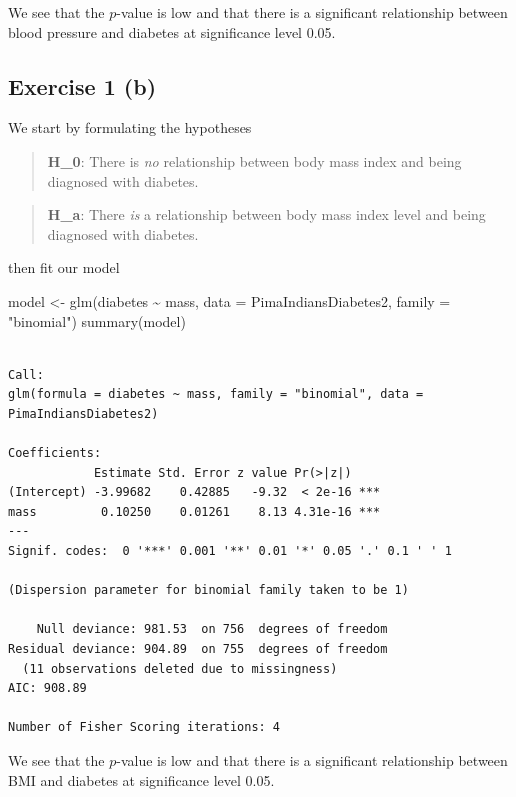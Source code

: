 \documentclass[
  letterpaper,
  DIV=11,
  numbers=noendperiod]{scrreprt}
\newenvironment{Shaded}{\begin{snugshade}}{\end{snugshade}}
\newcommand{\AttributeTok}[1]{\textcolor[rgb]{0.40,0.45,0.13}{#1}}
\newcommand{\FunctionTok}[1]{\textcolor[rgb]{0.28,0.35,0.67}{#1}}
\newcommand{\NormalTok}[1]{\textcolor[rgb]{0.00,0.23,0.31}{#1}}
\newcommand{\OtherTok}[1]{\textcolor[rgb]{0.00,0.23,0.31}{#1}}
\newcommand{\SpecialCharTok}[1]{\textcolor[rgb]{0.37,0.37,0.37}{#1}}
\newcommand{\StringTok}[1]{\textcolor[rgb]{0.13,0.47,0.30}{#1}}
\begin{document}
We see that the \(p\)-value is low and that there is a significant
relationship between blood pressure and diabetes at significance level
0.05.

\subsection{Exercise 1 (b)}\label{exercise-1-b}

We start by formulating the hypotheses

\begin{quote}
\textbf{H\_0}: There is \emph{no} relationship between body mass index
and being diagnosed with diabetes.
\end{quote}

\begin{quote}
\textbf{H\_a}: There \emph{is} a relationship between body mass index
level and being diagnosed with diabetes.
\end{quote}

then fit our model

\begin{Shaded}
\begin{Highlighting}[]
\NormalTok{model }\OtherTok{\textless{}{-}} \FunctionTok{glm}\NormalTok{(diabetes }\SpecialCharTok{\textasciitilde{}}\NormalTok{ mass, }\AttributeTok{data =}\NormalTok{ PimaIndiansDiabetes2, }\AttributeTok{family =} \StringTok{"binomial"}\NormalTok{)}
\FunctionTok{summary}\NormalTok{(model)}
\end{Highlighting}
\end{Shaded}

\begin{verbatim}

Call:
glm(formula = diabetes ~ mass, family = "binomial", data = PimaIndiansDiabetes2)

Coefficients:
            Estimate Std. Error z value Pr(>|z|)    
(Intercept) -3.99682    0.42885   -9.32  < 2e-16 ***
mass         0.10250    0.01261    8.13 4.31e-16 ***
---
Signif. codes:  0 '***' 0.001 '**' 0.01 '*' 0.05 '.' 0.1 ' ' 1

(Dispersion parameter for binomial family taken to be 1)

    Null deviance: 981.53  on 756  degrees of freedom
Residual deviance: 904.89  on 755  degrees of freedom
  (11 observations deleted due to missingness)
AIC: 908.89

Number of Fisher Scoring iterations: 4
\end{verbatim}

We see that the \(p\)-value is low and that there is a significant
relationship between BMI and diabetes at significance level 0.05.
\end{document}
